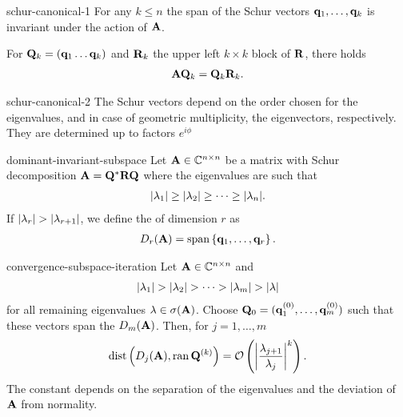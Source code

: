 \begin{Lemma}{schur-canonical-1}
  For any $k\le n$ the span of the Schur vectors
  $\vq_1,\dots,\vq_k$ is invariant under the action of $\mata$.

  For $\matq_k = (\vq_1\dots\vq_k)$ and $\matr_k$ the upper left $k\times k$ block of $\matr$, there holds
  \begin{gather}
    \mata\matq_k = \matq_k \matr_k.
  \end{gather}
\end{Lemma}

\begin{Lemma}{schur-canonical-2}
  The Schur vectors depend on the order chosen for the eigenvalues,
  and in case of geometric multiplicity, the eigenvectors,
  respectively. They are determined up to factors $e^{i\phi}$
\end{Lemma}

\begin{Definition}{dominant-invariant-subspace}
  Let $\mata\in\Cnn$ be a matrix with Schur decomposition
  $\mata = \matq^*\matr\matq$ where the eigenvalues are such that
  \begin{gather}
    \abs{\lambda_1}\ge\abs{\lambda_2}\ge\dots\ge\abs{\lambda_n}.
  \end{gather}
  If $\abs{\lambda_r}>\abs{\lambda_{r+1}}$, we define the
   of dimension $r$ as
  \begin{gather}
    D_r(\mata) = \spann{\vq_1,\dots,\vq_r}.
  \end{gather}
\end{Definition}

\begin{Theorem}{convergence-subspace-iteration}
  Let $\mata\in\Cnn$ and
  \begin{gather}
    \abs{\lambda_1} >
    \abs{\lambda_2}>\dots>\abs{\lambda_m}>\abs{\lambda}
  \end{gather}
  for all remaining eigenvalues $\lambda\in\sigma(\mata)$. Choose
  $\matq_0 = (\vq^{(0)}_1,\dots,\vq^{(0)}_{m})$ such that these vectors span
  the  $D_m(\mata)$. Then, for $j=1,\dots,m$
  \begin{gather}
    \dist\left(D_j(\mata),\ran{\matq^{(k)}}\right)
    = \bigo \left(\abs*{\frac{\lambda_{j+1}}{\lambda_j}}^k\right).
  \end{gather}
  The constant depends on the separation of the eigenvalues and the deviation of $\mata$ from normality.
\end{Theorem}

